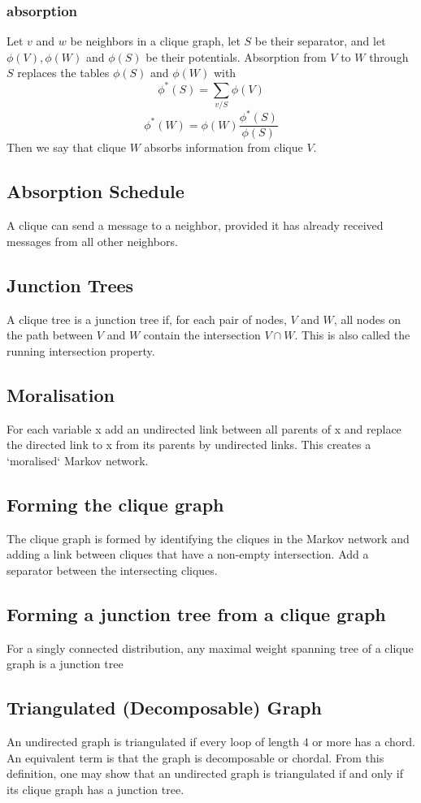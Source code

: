 \documentclass[12pt,a4paper]{article}
\begin{document}
\subsubsection*{absorption}
Let $v$ and $w$ be neighbors in a clique graph, let $S$ be their separator, and let $\phi(V),\phi(W)$ and $\phi(S)$ be their potentials. Absorption from $V$ to $W$ through $S$ replaces the tables $\phi(S)$ and $\phi(W)$ with
$$
\phi^*(S) = \sum_{v/S} \phi(V)
$$  
$$
\phi^*(W) = \phi(W) \frac{\phi^*(S)}{\phi(S)}
$$
Then we say that clique $W$ absorbs information from clique $V$.
\subsection*{Absorption Schedule}
A clique can send a message to a neighbor, provided it has already received messages from all other neighbors.
\subsection*{Junction Trees}
A clique tree is a junction tree if, for each pair of nodes, $V$ and $W$, all nodes on the path between $V$ and $W$ contain the intersection $V \cap W$. This is also called the running intersection
property.
\subsection*{Moralisation}
For each variable x add an undirected link between all parents of x and replace the directed link to x from its parents by undirected links. This creates a `moralised` Markov network.
\subsection*{Forming the clique graph}
The clique graph is formed by identifying the cliques in the Markov network and adding a link between
cliques that have a non-empty intersection. Add a separator between the intersecting cliques.
\subsection*{Forming a junction tree from a clique graph}
For a singly connected distribution, any maximal weight spanning tree of a clique graph is a junction tree
\subsection*{Triangulated (Decomposable) Graph}
An undirected graph is triangulated if every loop of length 4 or more has a chord. An equivalent term is that the graph is decomposable or chordal. From this definition, one may show that an undirected graph is triangulated if and only if its clique graph has a junction tree.
\end{document}

